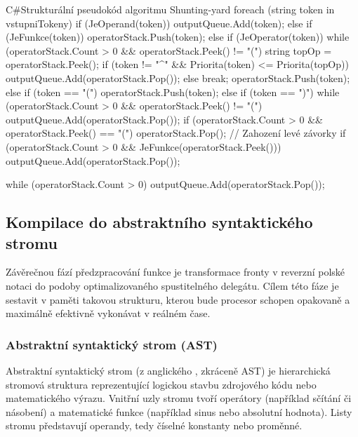 \documentclass[czech, kiv, sem, he, iso690alph, pdf,viewonly]{fasthesis}
\begin{document}
\begin{code}{C#}{Strukturální pseudokód algoritmu Shunting-yard\label{lst:shunting_yard}}
foreach (string token in vstupniTokeny) {
    if (JeOperand(token)) {
        outputQueue.Add(token);
    } else if (JeFunkce(token)) {
        operatorStack.Push(token);
    } else if (JeOperator(token)) {
        while (operatorStack.Count > 0 && operatorStack.Peek() != "(") {
            string topOp = operatorStack.Peek();
            if (token != "^" && Priorita(token) <= Priorita(topOp)) {
                outputQueue.Add(operatorStack.Pop());
            } else {
                break;
            }
        }
        operatorStack.Push(token);
    } else if (token == "(") {
        operatorStack.Push(token);
    } else if (token == ")") {
        while (operatorStack.Count > 0 && operatorStack.Peek() != "(") {
            outputQueue.Add(operatorStack.Pop());
        }
        if (operatorStack.Count > 0 && operatorStack.Peek() == "(") {
            operatorStack.Pop(); // Zahození levé závorky
        }
        if (operatorStack.Count > 0 && JeFunkce(operatorStack.Peek())) {
            outputQueue.Add(operatorStack.Pop());
        }
    }
}

while (operatorStack.Count > 0) {
    outputQueue.Add(operatorStack.Pop());
}
\end{code}

\subsection{Kompilace do abstraktního syntaktického stromu}
Závěrečnou fází předzpracování funkce je transformace fronty v reverzní polské notaci do podoby optimalizovaného spustitelného delegátu. 
Cílem této fáze je sestavit v paměti takovou strukturu, kterou bude procesor schopen opakovaně a maximálně efektivně vykonávat v reálném čase.

\subsubsection{Abstraktní syntaktický strom (AST)}
Abstraktní syntaktický strom (z anglického , zkráceně AST) je hierarchická stromová struktura reprezentující logickou stavbu zdrojového kódu nebo matematického výrazu. 
Vnitřní uzly stromu tvoří operátory (například sčítání či násobení) a matematické funkce (například sinus nebo absolutní hodnota). Listy stromu představují operandy, tedy číselné konstanty nebo proměnné.
\end{document}

